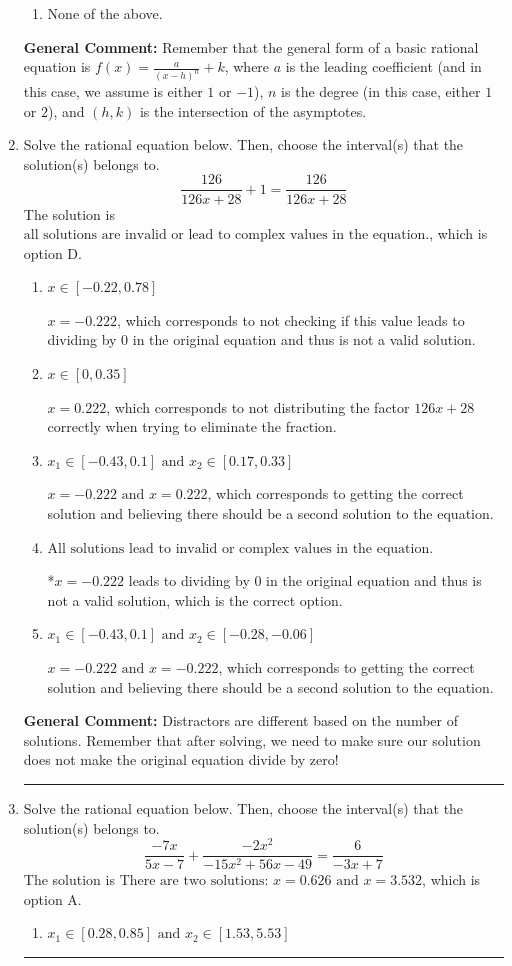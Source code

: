 \documentclass{extbook}[14pt]
\newcommand{\litem}[1]{\item #1

\rule{\textwidth}{0.4pt}}
\begin{document}
\begin{enumerate}
{\begin{enumerate}[label=\Alph*.]
\begin{multicols}{2}
\end{multicols}\item None of the above.\end{enumerate}
\textbf{General Comment:} Remember that the general form of a basic rational equation is $ f(x) = \frac{a}{(x-h)^n} + k$, where $a$ is the leading coefficient (and in this case, we assume is either $1$ or $-1$), $n$ is the degree (in this case, either $1$ or $2$), and $(h, k)$ is the intersection of the asymptotes.
}
\litem{
Solve the rational equation below. Then, choose the interval(s) that the solution(s) belongs to.
\[ \frac{126}{126x + 28} + 1 = \frac{126}{126x + 28} \]The solution is \( \text{all solutions are invalid or lead to complex values in the equation.} \), which is option D.\begin{enumerate}[label=\Alph*.]
\item \( x \in [-0.22,0.78] \)

$x = -0.222$, which corresponds to not checking if this value leads to dividing by 0 in the original equation and thus is not a valid solution.
\item \( x \in [0,0.35] \)

$x = 0.222$, which corresponds to not distributing the factor $126x + 28$ correctly when trying to eliminate the fraction.
\item \( x_1 \in [-0.43, 0.1] \text{ and } x_2 \in [0.17,0.33] \)

$x = -0.222 \text{ and } x = 0.222$, which corresponds to getting the correct solution and believing there should be a second solution to the equation.
\item \( \text{All solutions lead to invalid or complex values in the equation.} \)

*$x = -0.222$ leads to dividing by 0 in the original equation and thus is not a valid solution, which is the correct option.
\item \( x_1 \in [-0.43, 0.1] \text{ and } x_2 \in [-0.28,-0.06] \)

$x = -0.222 \text{ and } x = -0.222$, which corresponds to getting the correct solution and believing there should be a second solution to the equation.
\end{enumerate}

\textbf{General Comment:} Distractors are different based on the number of solutions. Remember that after solving, we need to make sure our solution does not make the original equation divide by zero!
}
\litem{
Solve the rational equation below. Then, choose the interval(s) that the solution(s) belongs to.
\[ \frac{-7x}{5x -7} + \frac{-2x^{2}}{-15x^{2} +56 x -49} = \frac{6}{-3x + 7} \]The solution is \( \text{There are two solutions: } x = 0.626 \text{ and } x = 3.532 \), which is option A.\begin{enumerate}[label=\Alph*.]
\item \( x_1 \in [0.28, 0.85] \text{ and } x_2 \in [1.53,5.53] \)


\end{enumerate}}
\end{enumerate}
\end{document}
